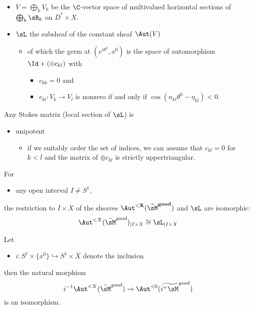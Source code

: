 \begin{itemize}
  \item $V=\bigoplus_kV_k$ be the $\C$-vector space of multivalued horizontal
    sections of $\bigoplus_k\sR_k$ on $D^*\times X$.
  \item $\sL$ the subsheaf of the constant sheaf $\Aut(V)$
    \begin{itemize}
      \item of which the germ at $(e^{i\theta^0},x^0)$ is
        the space of automorphism $\Id+(\oplus c_{kl})$ with
        \begin{itemize}
          \item $c_{kk}=0$ and
          \item $c_{kl}:V_k\to V_l$ is nonzero if and only if
            $\cos(n_{kl}\theta^0-\eta_{kl})<0$.
        \end{itemize}
    \end{itemize}
\end{itemize}
\begin{rem}
  Any Stokes matrix (local section of $\sL$) is
  \begin{itemize}
    \item unipotent
      \begin{itemize}
        \item if we suitably order the set of indices, we can assume that
          $c_{kl}=0$ for $k<l$ and the matrix of $\oplus c_{kl}$ is strictly
          uppertriangular.
      \end{itemize}
  \end{itemize}
\end{rem}
\begin{cor}
  For
  \begin{itemize}
    \item any open interval $I\neq S^1$,
  \end{itemize}
  the restriction to $I\times X$ of the
  sheaves $\bf\Aut^{<X}(\tilde\sM^{good})$ and $\bf\sL$ are isomorphic:
  \[
    \Aut^{<X}(\tilde\sM^{good})_{|I\times X}
    \cong
    \sL_{|I\times X}
  \]
\end{cor}
\begin{cor}
  Let
  \begin{itemize}
    \item $i:S^1\times\{x^0\}\hookrightarrow S^1\times X$ denote the inclusion
  \end{itemize}
  then the natural morphism
  \[
    i^{-1}\Aut^{<X}(\tilde\sM^{good})\to\Aut^{<0}(\widetilde{i^+\sM}^{good})
  \]
  is an isomorphism.
\end{cor}
